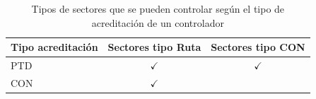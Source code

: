 \begin{table}[h]
    \centering
    \caption{Tipos de sectores que se pueden controlar según el tipo de acreditación de un controlador}
    \begin{tabular}{lcc}
        \hline
        \textbf{Tipo acreditación} & \textbf{Sectores tipo Ruta} & \textbf{Sectores tipo CON} \\ \hline
        PTD & $\checkmark$                & $\checkmark$               \\
        CON & $\checkmark$                &                            \\ \hline
    \end{tabular}
    \label{table:2:acreditaciones}
\end{table}










